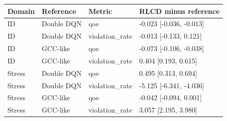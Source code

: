 \begin{tabular}{llll}
\toprule
Domain & Reference & Metric & RLCD minus reference \\
\midrule
ID & Double DQN & qoe & -0.023 [-0.036, -0.013] \\
ID & Double DQN & violation\_rate & -0.013 [-0.133, 0.121] \\
ID & GCC-like & qoe & -0.073 [-0.106, -0.038] \\
ID & GCC-like & violation\_rate & 0.404 [0.193, 0.615] \\
Stress & Double DQN & qoe & 0.495 [0.313, 0.694] \\
Stress & Double DQN & violation\_rate & -5.125 [-6.341, -4.036] \\
Stress & GCC-like & qoe & -0.042 [-0.094, 0.001] \\
Stress & GCC-like & violation\_rate & 3.057 [2.195, 3.980] \\
\bottomrule
\end{tabular}
